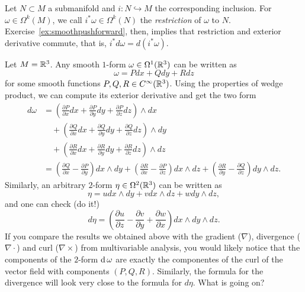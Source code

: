 Let $N\subset M$ a submanifold and $i:N\hookrightarrow M$ the corresponding inclusion.
For $\omega\in\Omega^k(M)$, we call $i^*\omega \in \Omega^k(N)$ the \emph{restriction} of $\omega$ to $N$.
Exercise~\ref{ex:smoothpushforward}, then, implies that restriction and exterior derivative commute, that is, $i^*d\omega = d(i^*\omega)$.

\begin{example}
  Let $M=\mathbb{R}^3$. Any smooth $1$-form $\omega\in\Omega^1(\mathbb{R}^3)$ can be written as
  \begin{equation}
    \omega = P dx + Q dy + R dz
  \end{equation}
  for some smooth functions $P,Q,R\in C^\infty(\mathbb{R}^3)$.
  Using the properties of wedge product, we can compute its exterior derivative and get the two form
  \begin{align}
    d\omega &= \left(\frac{\partial P}{\partial x} dx + \frac{\partial P}{\partial y} dy + \frac{\partial P}{\partial z} dz \right) \wedge dx \\
      &\quad+\left(\frac{\partial Q}{\partial x} dx + \frac{\partial Q}{\partial y} dy + \frac{\partial Q}{\partial z} dz \right) \wedge dy \\
      &\quad+\left(\frac{\partial R}{\partial x} dx + \frac{\partial R}{\partial y} dy + \frac{\partial R}{\partial z} dz \right) \wedge dz \\
    &= \left(\frac{\partial Q}{\partial x} - \frac{\partial P}{\partial y}\right) dx \wedge dy + 
    \left(\frac{\partial R}{\partial x} - \frac{\partial P}{\partial z}\right) dx \wedge dz + \left(\frac{\partial R}{\partial y} - \frac{\partial Q}{\partial z}\right) dy \wedge dz.
  \end{align}
  Similarly, an arbitrary $2$-form $\eta\in\Omega^2(\mathbb{R}^3)$ can be written as
  \begin{equation}
    \eta = u dx\wedge dy + v dx\wedge dz + w dy\wedge dz,
  \end{equation}
  and one can check (do it!)
  \begin{equation}
    d\eta = \left(\frac{\partial u}{\partial z}-\frac{\partial v}{\partial y} + \frac{\partial w}{\partial x}\right) dx\wedge dy \wedge dz.
  \end{equation}
  If you compare the results we obtained above with the gradient ($\nabla$), divergence ($\nabla\cdot$) and curl ($\nabla\times$) from multivariable analysis, you would likely notice that the components of the $2$-form $\operatorname{d}\omega$ are exactly the componentes of the curl of the vector field with components $(P, Q, R)$.
  Similarly, the formula for the divergence will look very close to the formula for $d\eta$. 
  What is going on?
  

\end{example}
